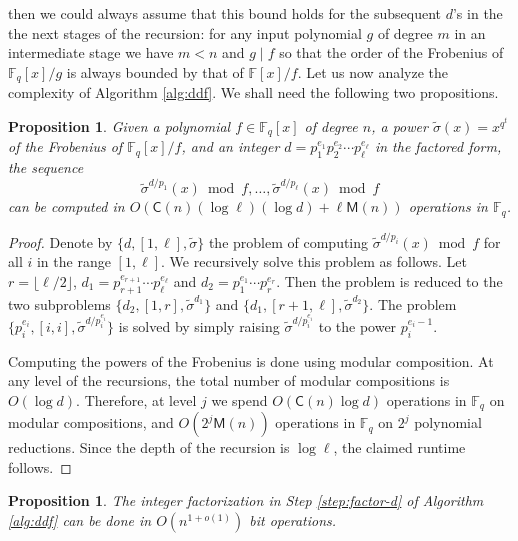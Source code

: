 \documentclass{article}
\theoremstyle{plain}
\newtheorem{proposition}[theorem]{Proposition}
\theoremstyle{definition}
\def\F{\ensuremath{\mathbb{F}}}
\def\MM{\ensuremath{\mathsf{M}}}
\def\CC{\ensuremath{\mathsf{C}}}
\begin{document}
then we could always assume that this bound holds for the subsequent $d$'s in the the next stages of 
the recursion: for any input polynomial $g$ of degree $m$ in an intermediate stage we have $m < n$ 
and $g \mid f$ so that the order of the Frobenius of $\F_q[x] / g$ is always bounded by that of 
$\F[x] / f$. Let us now analyze the complexity of Algorithm \ref{alg:ddf}. We shall need the 
following two propositions.
\begin{proposition}
	\label{prop:frobs}
	Given a polynomial $f \in \F_q[x]$ of degree $n$, a power $\tilde{\sigma}(x) = x^{q^t}$ of 
	the Frobenius of $\F_q[x] / f$, and an integer $d = p_1^{e_1} p_2^{e_2} \cdots p_\ell^{e_\ell}$ 
	in the factored form, the sequence
	\begin{equation}
	\label{equ:frobs}
		\tilde{\sigma}^{d / p_1}(x) \bmod f, \dots, \tilde{\sigma}^{d / p_\ell}(x) \bmod f
	\end{equation}
	can be computed in $O(\CC(n)(\log \ell)(\log d) + \ell\MM(n))$ operations in $\F_q$.
\end{proposition}
\begin{proof}
	Denote by $\{ d, [1, \ell], \tilde{\sigma} \}$ the problem of computing $\tilde{\sigma}^{d / 
	p_i}(x) \bmod f$ for all $i$ in the range $[1, \ell]$. We recursively solve this problem as 
	follows. Let $r = \lfloor \ell / 2 \rfloor$, $d_1 = p_{r + 1}^{e_{r + 1}} \cdots 
	p_\ell^{e_\ell}$ and $d_2 = p_1^{e_1} \cdots p_r^{e_r}$. Then the problem is reduced to the 
	two subproblems $\{ d_2, [1, r], \tilde{\sigma}^{d_1} \}$ and $\{ d_1, [r + 1, \ell], 
	\tilde{\sigma}^{d_2} \}$. The problem $\{ p_i^{e_i}, [i, i], \tilde{\sigma}^{d / p_i^{e_i}} \}$ 
	is solved by simply raising $\tilde{\sigma}^{d / p_i^{e_i}}$ to the power $p_i^{e_i - 1}$.
	
	Computing the powers of the Frobenius is done using modular composition. At any level of the 
	recursions, the total number of modular compositions is $O(\log d)$. Therefore, at level $j$ we 
	spend $O(\CC(n) \log d)$ operations in $\F_q$ on modular compositions, and $O(2^j\MM(n))$ 
	operations in $\F_q$ on $2^j$ polynomial reductions. Since the depth of the recursion is $\log 
	\ell$, the 	claimed runtime follows.
\end{proof}
\begin{proposition}
	\label{prop:factor-d}
	The integer factorization in Step \ref{step:factor-d} of Algorithm \ref{alg:ddf} can be done in 
	$O(n^{1 + o(1)})$ bit operations.
\end{proposition}
\end{document}
